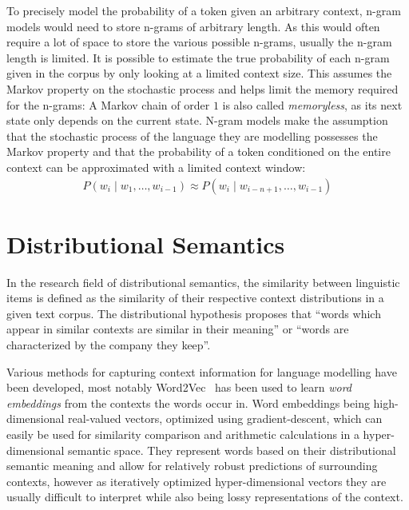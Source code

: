 \noindent
To precisely model the probability of a token given an arbitrary context, n-gram models would need to store n-grams of arbitrary length. As this would often require a lot of space to store the various possible n-grams, usually the n-gram length is limited. It is possible to estimate the true probability of each n-gram given in the corpus by only looking at a limited context size. This assumes the Markov property on the stochastic process and helps limit the memory required for the n-grams:
\noindent
A Markov chain of order $1$ is also called \textit{memoryless}, as its next state only depends on the current state. N-gram models make the assumption that the stochastic process of the language they are modelling possesses the Markov property and that the probability of a token conditioned on the entire context can be approximated with a limited context window:
\begin{align*}
    P(w_i \mid w_{1}, \ldots, w_{i-1}) \approx P(w_i \mid w_{i - n + 1}, \ldots, w_{i-1})
\end{align*}

\section{Distributional Semantics}

In the research field of distributional semantics, the similarity between linguistic 
items is defined as the similarity of their respective context distributions in a 
given text corpus. The distributional hypothesis proposes that ``words which 
appear in similar contexts are similar in their meaning'' or ``words are 
characterized by the company they keep''.

\noindent
Various methods for capturing context information for language modelling have been developed, most notably Word2Vec~\cite{mikolov2013efficient} has been used to learn \emph{word embeddings} from the contexts the words occur in. Word embeddings being high-dimensional real-valued vectors, optimized using gradient-descent, which can easily be used for similarity comparison and arithmetic calculations in a hyper-dimensional semantic space. They represent words based on their distributional semantic meaning and allow for relatively robust predictions of surrounding contexts, however as iteratively optimized hyper-dimensional vectors they are usually difficult to interpret while also being lossy representations of the context.

